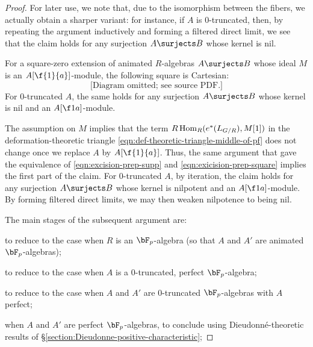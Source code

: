 \begin{proof}
For later use, we note that, due to the isomorphism between the fibers, we actually obtain a sharper variant: for instance, if $A$ is $0$-truncated, then, by repeating the argument inductively and forming a filtered direct limit, we see that the claim holds for any surjection $A\surjects B$ whose kernel is nil.
\epf


\begin{claim}
\notready \label{claim:def-theoretic-reduction-2}
For a square-zero extension of animated $R$-algebras $A\surjects B$  whose ideal $M$ is an $A[\f{1}{a}]$-module, the following square is Cartesian:
\[\text{[Diagram omitted; see source PDF.]}
\]
For  $0$-truncated $A$, the same holds for any surjection $A\surjects B$ whose kernel is nil and an $A[\f 1a]$-module.
\end{claim}

\bpf
The assumption on $M$ implies that the term $R\operatorname{Hom}_R(e^*(L_{G/R}), M[1])$ in the deformation-theoretic triangle \eqref{eqn:def-theoretic-triangle-middle-of-pf} does not change once we replace $A$ by $A[\f{1}{a}]$. Thus, the same argument that gave the equivalence of \eqref{eqn:excision-prep-supp} and \eqref{eqn:exicision-prep-square} implies the first part of the claim.  For $0$-truncated $A$, by iteration, the claim holds for any surjection $A\surjects B$ whose kernel is nilpotent and an $A[\f 1a]$-module. By forming filtered direct limits, we may then weaken nilpotence to being nil. %
\epf



The main stages of the subsequent argument are:
\benuma
\item
to reduce to the case when $R$ is an $\bF_p$-algebra (so that $A$ and $A'$ are animated $\bF_p$-algebras);

\m
to reduce to the case when $A$ is a $0$-truncated, perfect $\bF_p$-algebra;

\item
to reduce to the case when $A$ and $A'$ are $0$-truncated $\bF_p$-algebras with $A$ perfect;


\item
when $A$ and $A'$ are perfect $\bF_p$-algebras, to conclude using Dieudonn\'{e}-theoretic results of \S\ref{section:Dieudonne-positive-characteristic};


\end{proof}
